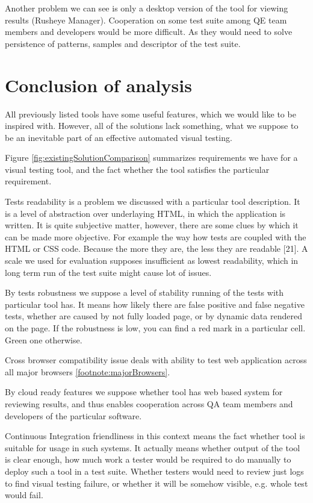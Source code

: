 \documentclass[11pt,oneside,final]{fithesis2}
\begin{document}
  Another problem we can see is only a desktop version of the tool for viewing results (Rusheye Manager). Cooperation on some test suite among QE team members and developers would be 
  more difficult. As they would need to solve persistence of patterns, samples and descriptor of the test suite.
  
  \section{Conclusion of analysis}
  \label{chap:conclusion}
  All previously listed tools have some useful features, which we would like to be inspired with. However, all of the solutions lack something, what we suppose to be an inevitable part of 
  an effective automated visual testing.
  
  Figure \ref{fig:existingSolutionComparison} summarizes requirements we have for a visual testing tool, and the fact whether the tool satisfies the particular requirement.
  
  Tests readability is a problem we discussed with a particular tool description. It is a level of abstraction over underlaying HTML, in which the application is written. It is quite subjective
  matter, however, there are some clues by which it can be made more objective. For example the way how tests are coupled with the HTML or CSS code. Because the more they are, the less they 
  are readable [21]. A scale we used for evaluation supposes insufficient as lowest readability, which in long term run of the test suite might cause lot of issues.
  
  By tests robustness we suppose a level of stability running of the tests with particular tool has. 
  It means how likely there are false positive and false negative tests, whether are caused by not fully loaded page, or by dynamic data rendered on the page. If the robustness is low,
  you can find a red mark in a particular cell. Green one otherwise.
  
  Cross browser compatibility issue deals with ability to test web application across all major browsers \ref{footnote:majorBrowsers}.
  
  By cloud ready features we suppose whether tool has web based system for reviewing results, and thus enables cooperation across QA team members and developers of the particular software.
  
  Continuous Integration friendliness in this context means the fact whether tool is suitable for usage in such systems. It actually means whether output of the tool is clear enough,
  how much work a tester would be required to do manually to deploy such a tool in a test suite. Whether testers would need to review just logs to find visual testing failure, or
  whether it will be somehow visible, e.g. whole test would fail.
  
\end{document}
